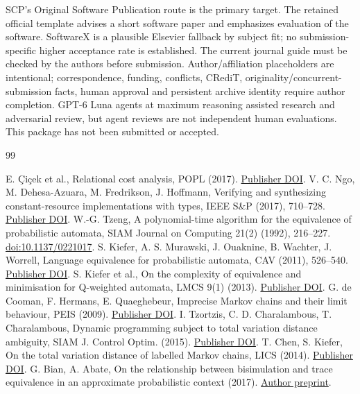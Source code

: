 \documentclass[11pt,a4paper]{article}
\begin{document}
SCP's Original Software Publication route is the primary target. The retained official template advises a short software paper and emphasizes evaluation of the software. SoftwareX is a plausible Elsevier fallback by subject fit; no submission-specific higher acceptance rate is established. The current journal guide must be checked by the authors before submission. Author/affiliation placeholders are intentional; correspondence, funding, conflicts, CRediT, originality/concurrent-submission facts, human approval and persistent archive identity require author completion. GPT-6 Luna agents at maximum reasoning assisted research and adversarial review, but agent reviews are not independent human evaluations. This package has not been submitted or accepted.

\begin{thebibliography}{99}
\raggedright
{} E. \c{C}i\c{c}ek et al., Relational cost analysis, POPL (2017). \href{https://doi.org/10.1145/3009837.3009858}{Publisher DOI}.
 V. C. Ngo, M. Dehesa-Azuara, M. Fredrikson, J. Hoffmann, Verifying and synthesizing constant-resource implementations with types, IEEE S\&P (2017), 710--728. \href{https://doi.org/10.1109/SP.2017.53}{Publisher DOI}.
 W.-G. Tzeng, A polynomial-time algorithm for the equivalence of probabilistic automata, SIAM Journal on Computing 21(2) (1992), 216--227. \href{https://doi.org/10.1137/0221017}{doi:10.1137/0221017}.
 S. Kiefer, A. S. Murawski, J. Ouaknine, B. Wachter, J. Worrell, Language equivalence for probabilistic automata, CAV (2011), 526--540. \href{https://doi.org/10.1007/978-3-642-22110-1_42}{Publisher DOI}.
 S. Kiefer et al., On the complexity of equivalence and minimisation for Q-weighted automata, LMCS 9(1) (2013). \href{https://doi.org/10.2168/LMCS-9(1:8)2013}{Publisher DOI}.
 G. de Cooman, F. Hermans, E. Quaeghebeur, Imprecise Markov chains and their limit behaviour, PEIS (2009). \href{https://doi.org/10.1017/S0269964809990039}{Publisher DOI}.
 I. Tzortzis, C. D. Charalambous, T. Charalambous, Dynamic programming subject to total variation distance ambiguity, SIAM J. Control Optim. (2015). \href{https://doi.org/10.1137/140955707}{Publisher DOI}.
 T. Chen, S. Kiefer, On the total variation distance of labelled Markov chains, LICS (2014). \href{https://doi.org/10.1145/2603088.2603099}{Publisher DOI}.
 G. Bian, A. Abate, On the relationship between bisimulation and trace equivalence in an approximate probabilistic context (2017). \href{https://arxiv.org/abs/1701.04547}{Author preprint}.

\end{thebibliography}
\end{document}
